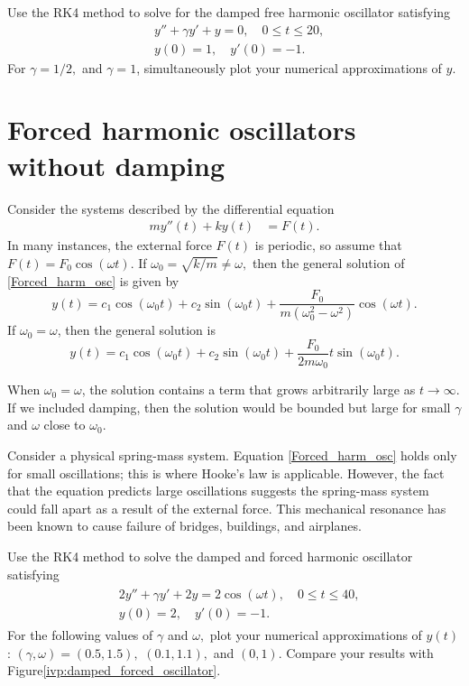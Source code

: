 \begin{problem}
Use the RK4 method to solve for the damped free harmonic oscillator satisfying 
\begin{align*}
&{}y'' +\gamma y'+ y = 0, \quad 0 \leq t \leq 20,\\
&{}y(0) = 1, \quad
y'(0) = -1.
\end{align*}
For $\gamma = 1/2,$ and $\gamma = 1$, simultaneously plot your numerical approximations of $y$.
\end{problem}

\section*{Forced harmonic oscillators without damping}
Consider the systems described by the differential equation
\begin{align}
my''(t)  + ky(t) &= F(t). \label{Forced_harm_osc}
\end{align}
In many instances, the external force $F(t)$ is periodic, so assume that $F(t) = F_0 \cos(\omega t)$. 
If $\omega_0 = \sqrt{k/m} \not = \omega,$ then the  general solution of \ref{Forced_harm_osc} is given by
\[y(t) = c_1 \cos (\omega_0 t) + c_2\sin (\omega_0 t) + \frac{F_0}{m(\omega_0^2 - \omega^2)} \cos (\omega t).\]
If $\omega_0 = \omega$, then the general solution is
\[y(t) = c_1 \cos (\omega_0 t) + c_2\sin (\omega_0 t) + \frac{F_0}{2m\omega_0} t \sin (\omega_0 t).\]

When $\omega_0 = \omega$, the solution contains a term that grows arbitrarily large as $t \to \infty$.
If we included damping, then the solution would be bounded but large for small $\gamma$ and $\omega$ close to $\omega_0$.

Consider a physical spring-mass system.
Equation \ref{Forced_harm_osc} holds only for small oscillations; this is where Hooke's law is applicable.
However, the fact that the equation predicts large oscillations suggests the spring-mass system could fall apart as a result of the external force. 
This mechanical resonance has been known to cause failure of bridges, buildings, and airplanes.

\begin{problem}
Use the RK4 method to solve the damped and forced harmonic oscillator satisfying 
\begin{align}
	\begin{split}
&{}2y'' + \gamma y' + 2y = 2 \cos (\omega t), \quad 0 \leq t \leq 40,\\
&{}y(0) = 2, \quad
y'(0) = -1. 
	\end{split}
	\label{ivp:damped_forced_oscillator}
\end{align}
For the following values of $\gamma$ and $\omega,$ plot your numerical approximations of $y(t)$: $(\gamma, \omega) = (0.5, 1.5),$ $(0.1, 1.1),$ and $(0, 1)$.
Compare your results with Figure\ref{ivp:damped_forced_oscillator}.
\end{problem}


